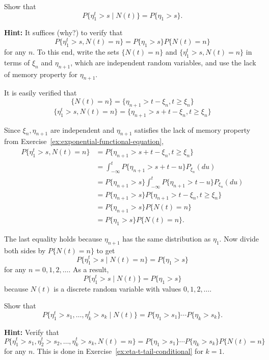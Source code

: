 \begin{Exercise}
\label{ex:eta-t-tail-conditional}
Show that
\begin{equation}
P\{\eta_1^t > s \mid N(t)\} = P\{\eta_1 > s\}.
\label{eq:eta-t-tail-conditional}
\end{equation}

\noindent\textbf{Hint:} It suffices (why?) to verify that
\[
P\{\eta_1^t > s, N(t) = n\} = P\{\eta_1 > s\} P\{N(t) = n\}
\]
for any $n$. To this end, write the sets $\{N(t) = n\}$ and $\{\eta_1^t > s, N(t) = n\}$ in terms of $\xi_n$ and $\eta_{n+1}$, which are independent random variables, and use the lack of memory property for $\eta_{n+1}$.
\end{Exercise}

\begin{Solution}
It is easily verified that
\[
\{N(t) = n\} = \{\eta_{n+1} > t - \xi_n, t \geq \xi_n\}
\]
\[
\{\eta_1^t > s, N(t) = n\} = \{\eta_{n+1} > s + t - \xi_n, t \geq \xi_n\}
\]

Since $\xi_n, \eta_{n+1}$ are independent and $\eta_{n+1}$ satisfies the lack of memory property from Exercise~\ref{ex:exponential-functional-equation},
\begin{equation}
\begin{aligned}
P\{\eta_1^t > s, N(t) = n\} &= P\{\eta_{n+1} > s + t - \xi_n, t \geq \xi_n\} \\
&= \int_{-\infty}^t P\{\eta_{n+1} > s + t - u\} P_{\xi_n}(du) \\
&= P\{\eta_{n+1} > s\} \int_{-\infty}^t P\{\eta_{n+1} > t - u\} P_{\xi_n}(du) \\
&= P\{\eta_{n+1} > s\} P\{\eta_{n+1} > t - \xi_n, t \geq \xi_n\} \\
&= P\{\eta_{n+1} > s\} P\{N(t) = n\} \\
&= P\{\eta_1 > s\} P\{N(t) = n\}.
\end{aligned}
\end{equation}

The last equality holds because $\eta_{n+1}$ has the same distribution as $\eta_1$. Now divide both sides by $P\{N(t) = n\}$ to get
\[
P\{\eta_1^t > s \mid N(t) = n\} = P\{\eta_1 > s\}
\]
for any $n = 0, 1, 2, \ldots$. As a result,
\[
P\{\eta_1^t > s \mid N(t)\} = P\{\eta_1 > s\}
\]
because $N(t)$ is a discrete random variable with values $0, 1, 2, \ldots$.
\end{Solution}

\begin{Exercise}
\label{ex:eta-t-independence}
Show that
\begin{equation}
P\{\eta_1^t > s_1, \ldots, \eta_k^t > s_k \mid N(t)\} = P\{\eta_1 > s_1\} \cdots P\{\eta_k > s_k\}.
\label{eq:eta-t-multivariate-conditional}
\end{equation}

\noindent\textbf{Hint:} Verify that
\[
P\{\eta_1^t > s_1, \eta_2^t > s_2, \ldots, \eta_k^t > s_k, N(t) = n\} = P\{\eta_1 > s_1\} \cdots P\{\eta_k > s_k\} P\{N(t) = n\}
\]
for any $n$. This is done in Exercise~\ref{ex:eta-t-tail-conditional} for $k = 1$.
\end{Exercise}

